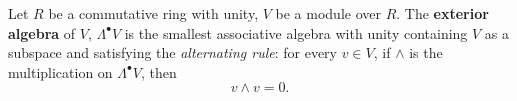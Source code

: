 \begin{definition}
  Let
    $R$ be a commutative ring with unity,
    $V$ be a module over $R$.
  The \textbf{exterior algebra} of $V$, $\Lambda^\bullet V$ is the smallest associative
  algebra with unity containing $V$ as a subspace and satisfying the
  \textit{alternating rule}:
  for every $v \in V$, if $\wedge$ is the multiplication on $\Lambda^\bullet V$, then
  \begin{equation}
    v \wedge v = 0.
  \end{equation}
\end{definition}
